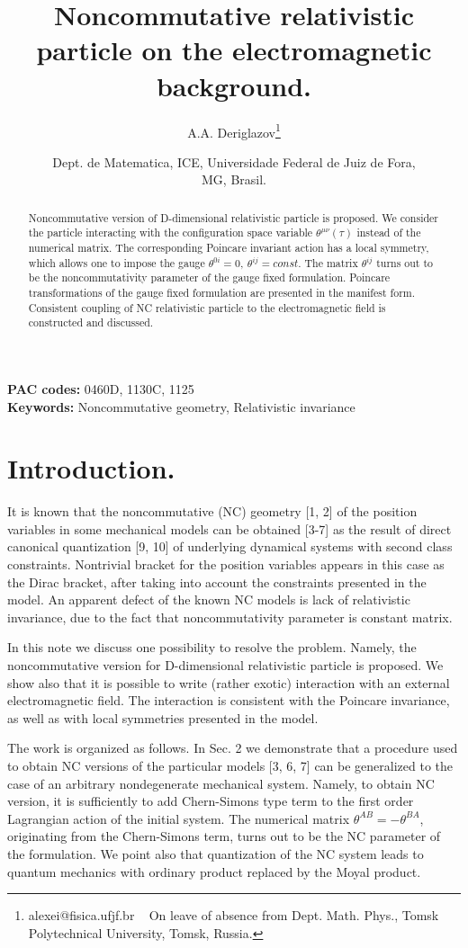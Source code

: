 \documentclass[paper a4]{article}
\title{Noncommutative relativistic particle on the electromagnetic
background.}
\author{A.A. Deriglazov\footnote{alexei@fisica.ufjf.br ~ On leave of
absence from Dept. Math. Phys., Tomsk Polytechnical University,
Tomsk, Russia.}}
\date{Dept. de Matematica, ICE, Universidade Federal de Juiz de Fora,\\
MG, Brasil.}
\begin{document}
\maketitle
\large
\begin{abstract}
Noncommutative version of D-dimensional relativistic particle is proposed.
We consider the particle interacting with the configuration space
variable $\theta^{\mu\nu}(\tau)$ instead of the numerical matrix. The
corresponding Poincare invariant action has a local symmetry, which
allows one to impose the gauge $\theta^{0i}=0, ~ \theta^{ij}=const$. The
matrix $\theta^{ij}$ turns out to be the noncommutativity parameter of
the gauge fixed formulation. Poincare transformations of the gauge
fixed formulation are presented in the manifest form.
Consistent coupling of NC relativistic particle to the electromagnetic
field is constructed and discussed.
\end{abstract}

{\bf PAC codes:} 0460D, 1130C, 1125 \\
{\bf Keywords:} Noncommutative geometry, Relativistic invariance\\

\noindent
\section{Introduction.}
It is known that the
noncommutative (NC) geometry [1, 2] of the position variables in
some mechanical
models can be obtained [3-7] as the result of direct canonical quantization
[9, 10] of underlying dynamical
systems with second class constraints. Nontrivial bracket for
the position variables appears in this case as the Dirac bracket,
after taking into account the constraints presented in the model.
An apparent defect of the known NC models is lack of relativistic invariance,
due to the fact that noncommutativity parameter is constant matrix.

In this note we discuss one possibility to resolve the problem. Namely,
the noncommutative version for D-dimensional
relativistic particle is proposed. We show also that it is possible to write
(rather exotic) interaction with an external electromagnetic field.
The interaction is consistent with the Poincare invariance, as well as
with local symmetries presented in the model.

The work is organized as follows. In Sec. 2 we demonstrate that a
procedure used to obtain NC versions of the particular models
[3, 6, 7] can be generalized to the case of an arbitrary nondegenerate
mechanical system. Namely, to obtain NC version, it is
sufficiently to add Chern-Simons type term to the first order Lagrangian
action of the initial system. The numerical matrix
$\theta^{AB}=-\theta^{BA}$, originating from the Chern-Simons term,
turns out to be the NC parameter of the formulation.
We point also that quantization of the NC system leads to quantum
mechanics with ordinary product replaced by the Moyal product.
\end{document}
